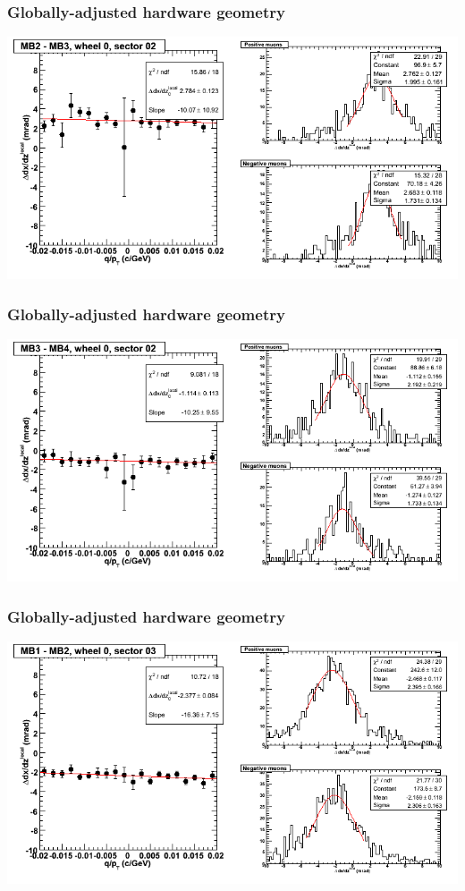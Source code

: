 \documentclass[compress]{beamer}
\begin{document}
\begin{frame}
\frametitle{Globally-adjusted hardware geometry}
\includegraphics[width=\linewidth]{NOV4_segdiffs_HW/dt13_slope_C_02_23.png}
\end{frame}

\begin{frame}
\frametitle{Globally-adjusted hardware geometry}
\includegraphics[width=\linewidth]{NOV4_segdiffs_HW/dt13_slope_C_02_34.png}
\end{frame}

\begin{frame}
\frametitle{Globally-adjusted hardware geometry}
\includegraphics[width=\linewidth]{NOV4_segdiffs_HW/dt13_slope_C_03_12.png}
\end{frame}
\end{document}
